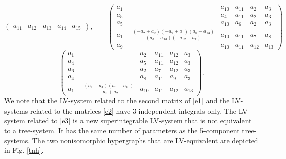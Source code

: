 \documentclass{article}
\begin{document}
\begin{enumerate}[1.]
\begin{equation}
\begin{pmatrix}
 a_{11} & a_{12} & a_{13} & a_{14} & a_{15} 
\end{pmatrix}, \qquad
\begin{pmatrix}
  a_{1} & a_{10} & a_{11} & a_{2} & a_{3} 
\\
 a_{5} & a_{4} & a_{11} & a_{2} & a_{3} 
\\
 a_{5} & a_{10} & a_{6} & a_{2} & a_{3} 
\\
 a_{1}-\frac{\left(-a_{7}+a_{2}\right) \left(-a_{9}+a_{1}\right) \left(a_{8}-a_{13}\right)}{\left(a_{3}-a_{13}\right) \left(-a_{12}+a_{7}\right)} & a_{10} & a_{11} & a_{7} & a_{8} 
\\
 a_{9} & a_{10} & a_{11} & a_{12} & a_{13}  
\end{pmatrix}
\end{equation}
\begin{equation} \label{e3}
\begin{pmatrix}
  a_{1} & a_{2} & a_{11} & a_{12} & a_{3} 
\\
 a_{4} & a_{5} & a_{11} & a_{12} & a_{3} 
\\
 a_{6} & a_{2} & a_{7} & a_{12} & a_{3} 
\\
 a_{4} & a_{8} & a_{11} & a_{9} & a_{3} 
\\
 a_{1}-\frac{\left(a_{1}-a_{4}\right) \left(a_{5}-a_{10}\right)}{-a_{5}+a_{2}} & a_{10} & a_{11} & a_{12} & a_{13}  
\end{pmatrix}.
\end{equation}
We note that the LV-system related to the second matrix of \eqref{e1} and the LV-systems related to the matrices \eqref{e2} have 3 independent integrals only. The LV-system related to \eqref{e3} is a new superintegrable LV-system that is not equivalent to a tree-system. It has the same number of parameters as the 5-component tree-systems. The two nonisomorphic hypergraphs that are LV-equivalent are depicted in Fig. \ref{tnh}.


\end{enumerate}
\end{document}
